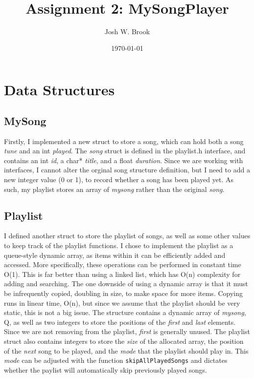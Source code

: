 \documentclass[11pt]{article}
\author{Josh W. Brook}
\date{\today}
\title{\textbf{Assignment 2: MySongPlayer}}
\begin{document}
\maketitle

\section{Data Structures}
\label{sec:org1d57472}

\subsection{MySong}
\label{sec:org8a0d256}

Firstly, I implemented a new struct to store a song, which can hold both a song \emph{tune} and an int \emph{played}.
The \emph{song} struct is defined in the playlist.h interface, and contains an int \emph{id}, a char* \emph{title}, and a float \emph{duration}.
Since we are working with interfaces, I cannot alter the orginal song structure definition, but I need to add a new integer value (0 or 1), to record whether a song has been played yet.
As such, my playlist stores an array of \emph{mysong} rather than the original \emph{song}.

\subsection{Playlist}
\label{sec:org7dd76dc}

I defined another struct to store the playlist of songs, as well as some other values to keep track of the playlist functions.
I chose to implement the playlist as a queue-style dynamic array, as items within it can be efficiently added and accessed. 
More specifically, these operations can be performed in constant time O(1).
This is far better than using a linked list, which has O(n) complexity for adding and searching.
The one downside of using a dynamic array is that it must be infrequently copied, doubling in size, to make space for more items.
Copying runs in linear time, O(n), but since we assume that the playlist should be very static, this is not a big issue.
The structure contains a dynamic array of \emph{mysong}, Q, as well as two integers to store the positions of the \emph{first} and \emph{last} elements.
Since we are not removing from the playlist, \emph{first} is generally unused.
The playlist struct also contains integers to store the \emph{size} of the allocated array, the position of the \emph{next} song to be played, and the \emph{mode} that the playlist should play in.
This \emph{mode} can be adjusted with the function \texttt{skipAllPlayedSongs} and dictates whether the paylist will automatically skip previously played songs.
\end{document}
